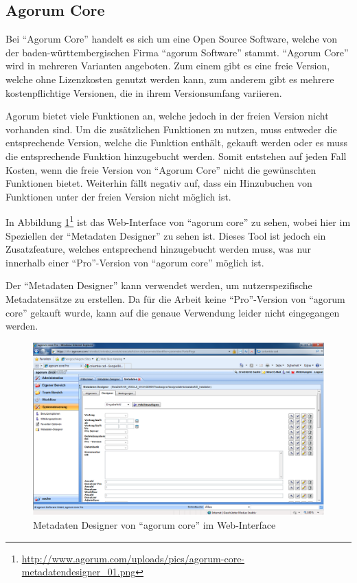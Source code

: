 \subsection{Agorum Core} \label{Agorum Core}
Bei "`Agorum Core"' handelt es sich um eine Open Source Software, welche von der baden-w\"urttembergischen Firma "`agorum Software"' stammt. "`Agorum Core"' wird in mehreren Varianten angeboten. Zum einem gibt es eine freie Version, welche ohne Lizenzkosten genutzt werden kann, zum anderem gibt es mehrere kostenpflichtige Versionen, die in ihrem Versionsumfang variieren. \cite{agorum_home} 

Agorum bietet viele Funktionen an, welche jedoch in der freien Version nicht vorhanden sind. Um die zus\"atzlichen Funktionen zu nutzen, muss entweder die entsprechende Version, welche die Funktion enth\"alt, gekauft werden oder es muss die entsprechende Funktion hinzugebucht werden.
Somit entstehen auf jeden Fall Kosten, wenn die freie Version von "`Agorum Core"' nicht die gew\"unschten Funktionen bietet. Weiterhin f\"allt negativ auf, dass ein Hinzubuchen von Funktionen unter der freien Version nicht m\"oglich ist. \cite{agorum_preise} \cite{Eval_DMS_Bachelor}

In Abbildung \ref{metadatendesigner agorum}\footnote{\url{http://www.agorum.com/uploads/pics/agorum-core-metadatendesigner_01.png}} ist das Web-Interface von "`agorum core"' zu sehen, wobei hier im Speziellen der "`Metadaten Designer"' zu sehen ist. Dieses Tool ist jedoch ein Zusatzfeature, welches entsprechend hinzugebucht werden muss, was nur innerhalb einer "`Pro"'-Version von "`agorum core"' m\"oglich ist. \cite{agorum_metadesigner_bild}

Der "`Metadaten Designer"' kann verwendet werden, um nutzerspezifische Metadatens\"atze zu erstellen.  Da f\"ur die Arbeit keine "`Pro"'-Version von "`agorum core"' gekauft wurde, kann auf die genaue Verwendung leider nicht eingegangen werden. \cite{agorum_metadaten_designer_video}

\begin{figure}[!ht]
\centering
\includegraphics[width=16cm]{Bilder/agorum-core-metadatendesigner.png}
\caption{Metadaten Designer von "`agorum core"' im Web-Interface}
\label{metadatendesigner agorum}
\centering
\end{figure}

